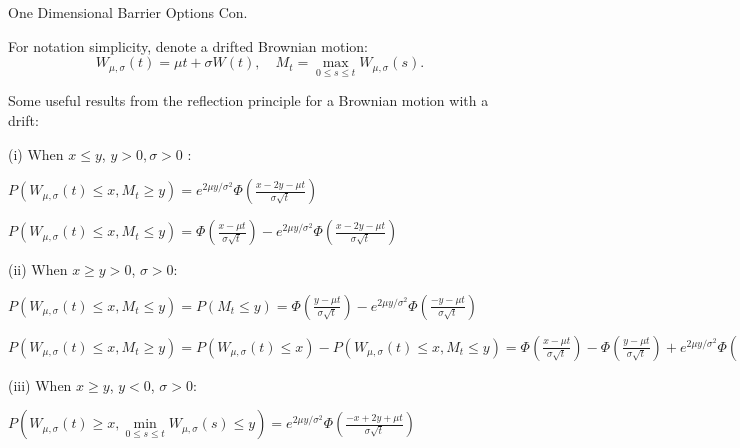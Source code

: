 \documentclass{beamer}
\begin{document}
\begin{frame}{One Dimensional Barrier Options Con.}
    
    {\footnotesize \footnotesize
    \par For notation simplicity, denote a drifted Brownian motion:
          \[
          W_{\mu,\sigma}(t) = \mu t + \sigma W(t), \quad M_t = \max_{0 \leq s \leq t} W_{\mu,\sigma}(s).
          \]
    \par Some useful results from the reflection principle for a Brownian motion with a  drift:
    \par (i) When \( x \leq y \), $y > 0,  \sigma > 0$ :
    \begin{itemize}
         {\footnotesize \scriptsize
        \item $P(W_{\mu, \sigma}(t) \leq x,  M_t \geq y) = e^{2\mu y / \sigma^2} 
        \Phi \left( \frac{x - 2y - \mu t}{\sigma \sqrt{t}} \right)$
        \item $P(W_{\mu, \sigma}(t) \leq x,  M_t \leq y) = \Phi \left( \frac{x - \mu t}{\sigma \sqrt{t}} \right) - e^{2\mu y / \sigma^2} 
         \Phi \left( \frac{x - 2y - \mu t}{\sigma \sqrt{t}} \right)$
         }
    \end{itemize}
    \par (ii) When \( x \geq y>0 \), $\sigma > 0$:
    \begin{itemize}
         {\footnotesize \scriptsize
        \item $P(W_{\mu, \sigma}(t) \leq x,  M_t \leq y) = P(M_t \leq y) \nonumber =
            \Phi \left( \frac{y - \mu t}{\sigma \sqrt{t}} \right) - e^{2\mu y / \sigma^2} \Phi 
            \left( \frac{-y - \mu t}{\sigma \sqrt{t}} \right)$
        \item $P(W_{\mu, \sigma}(t) \leq x,  M_t \geq y) = P(W_{\mu, \sigma}(t) \leq x) - P(W_{\mu, \sigma}(t) \leq x,  M_t \leq y) \nonumber 
            = \Phi \left( \frac{x - \mu t}{\sigma \sqrt{t}} \right) - 
            \Phi \left( \frac{y - \mu t}{\sigma \sqrt{t}} \right) + e^{2\mu y / \sigma^2} \Phi \left( \frac{-y - \mu t}{\sigma \sqrt{t}} \right)$
         }
    \end{itemize}
    \par (iii) When \( x \geq y \), $y < 0$, $\sigma > 0$:
    \begin{itemize}{\footnotesize \scriptsize
        \item $P\left( W_{\mu, \sigma}(t) \geq x, \min\limits_{0 \leq s \leq t} W_{\mu, \sigma}(s) \leq y \right) 
        = e^{2\mu y / \sigma^2} \Phi \left( \frac{-x + 2y + \mu t}{\sigma \sqrt{t}} \right)$
        }
    \end{itemize}
    }
\end{frame}
\end{document}
